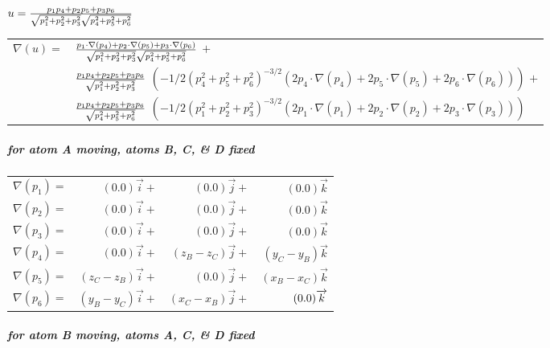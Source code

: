 $u=\frac{p_{1}p_{4}+p_{2}p_{5}+p_{3}p_{6}}{\sqrt{%
p_{1}^{2}+p_{2}^{2}+p_{3}^{2}}\sqrt{p_{4}^{2}+p_{5}^{2}+p_{6}^{2}}}\medskip
\medskip $

\begin{tabular}{ll}
$\nabla (u)=$ & $\frac{p_{1}\cdot \nabla (p_{4})+p_{2}\cdot \nabla
(p_{5})+p_{3}\cdot \nabla (p_{6})}{\sqrt{p_{1}^{2}+p_{2}^{2}+p_{3}^{2}}\sqrt{%
p_{4}^{2}+p_{5}^{2}+p_{6}^{2}}}$ $+$ \\ 
& $\frac{p_{1}p_{4}+p_{2}p_{5}+p_{3}p_{6}}{\sqrt{%
p_{1}^{2}+p_{2}^{2}+p_{3}^{2}}}$ $\left( -1/2\left(
p_{4}^{2}+p_{5}^{2}+p_{6}^{2}\right) ^{-3/2}\left( 2p_{4}\cdot \nabla
(p_{4})+2p_{5}\cdot \nabla (p_{5})+2p_{6}\cdot \nabla (p_{6})\right) \right) 
$ $+$ \\ 
& $\frac{p_{1}p_{4}+p_{2}p_{5}+p_{3}p_{6}}{\sqrt{%
p_{4}^{2}+p_{5}^{2}+p_{6}^{2}}}$ $\left( -1/2\left(
p_{1}^{2}+p_{2}^{2}+p_{3}^{2}\right) ^{-3/2}\left( 2p_{1}\cdot \nabla
(p_{1})+2p_{2}\cdot \nabla (p_{2})+2p_{3}\cdot \nabla (p_{3})\right) \right) 
$%
\end{tabular}
\pagebreak 

\subparagraph*{for atom A moving, atoms B, C, \& D fixed}

\begin{tabular}{lrrr}
$\nabla (p_{1})=$ & $(0.0)\overrightarrow{i}+$ & $(0.0)\overrightarrow{j}+$
& $(0.0)\overrightarrow{k}$ \\ 
$\nabla (p_{2})=$ & $(0.0)\overrightarrow{i}+$ & $(0.0)\overrightarrow{j}+$
& $(0.0)\overrightarrow{k}$ \\ 
$\nabla (p_{3})=$ & $(0.0)\overrightarrow{i}+$ & $(0.0)\overrightarrow{j}+$
& $(0.0)\overrightarrow{k}$ \\ 
$\nabla (p_{4})=$ & $(0.0)\overrightarrow{i}+$ & $(z_{B}-z_{C})%
\overrightarrow{j}+$ & $(y_{C}-y_{B})\overrightarrow{k}$ \\ 
$\nabla (p_{5})=$ & $(z_{C}-z_{B})\overrightarrow{i}+$ & $(0.0)%
\overrightarrow{j}+$ & $(x_{B}-x_{C})\overrightarrow{k}$ \\ 
$\nabla (p_{6})=$ & $(y_{B}-y_{C})\overrightarrow{i}+$ & $(x_{C}-x_{B})%
\overrightarrow{j}+$ & $(0.0)\nolinebreak \bigskip \overrightarrow{k}$%
\end{tabular}
\bigskip 

\subparagraph*{for atom B moving, atoms A, C, \& D fixed}

